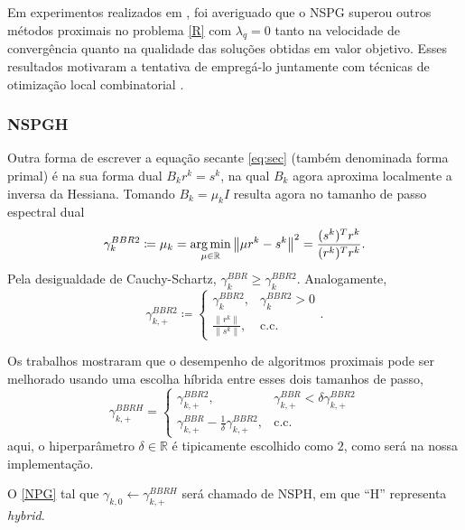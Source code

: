 Em experimentos realizados em \cite{manuscrito}, foi averiguado que o NSPG superou outros métodos proximais no problema \eqref{R} com $\lambda_q=0$ tanto na velocidade de convergência quanto na qualidade das soluções obtidas em valor objetivo. Esses resultados motivaram a tentativa de empregá-lo juntamente com técnicas de otimização local combinatorial \cite{fastselect}.

\subsubsection{NSPGH}
Outra forma de escrever a equação secante \eqref{eq:sec} (também denominada forma primal) é na sua forma dual $B_kr^k=s^k$, na qual $B_k$ agora aproxima localmente a inversa da Hessiana. Tomando $B_k=\mu_k I$ resulta agora no tamanho de passo espectral dual
\[    
\gamma_k^{BBR2}\coloneq\mu_k=\operatorname*{arg\,min}_{\mu\in\mathbb{R}}\left\|\mu r^k-s^k\right\|^2=\frac{(s^k)^Tr^k}{(r^k)^Tr^k}.
\]
Pela desigualdade de Cauchy-Schartz, $\gamma_k^{BBR}\geq \gamma_k^{BBR2}$. Analogamente,
\begin{equation}
    \gamma_{k,+}^{BBR2}\coloneq\begin{cases}
         \gamma_k^{BBR2},& \gamma_k^{BBR2}> 0\\
         \frac{\|r^k\|}{\|s^k\|},& \text{c.c.}\end{cases}.
    \label{BBR2}
\end{equation}

Os trabalhos \cite{hibrido1,hibrido2} mostraram que o desempenho de algoritmos proximais pode ser melhorado usando uma escolha híbrida entre esses dois tamanhos de passo,
\begin{equation}
\gamma^{BBRH}_{k,+} =
\begin{cases}
\gamma^{BBR2}_{k,+}, & \gamma^{BBR}_{k,+} < \delta \gamma^{BBR2}_{k,+} \\
\gamma^{BBR}_{k,+} - \frac{1}{\delta} \gamma^{BBR2}_{k,+}, & \text{c.c.}
\end{cases}
\label{hybrid}
\end{equation}
aqui, o hiperparâmetro $\delta \in \mathbb{R}$ é tipicamente escolhido como $2$, como será na nossa implementação.

O \autoref{NPG} tal que $\gamma_{k,0}\gets\gamma_{k,+}^{BBRH}$ 
será chamado de NSPH, em que ``H'' representa \textit{hybrid}.

